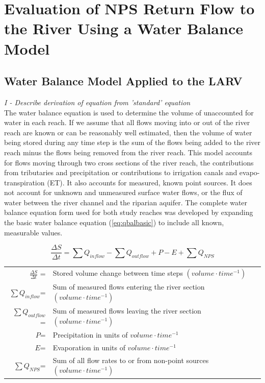 \chapter{Evaluation of NPS Return Flow to the River Using a Water Balance Model}
\label{chap:WaterBalanceModel}

\begin{linenumbers}
\section{Water Balance Model Applied to the LARV}
\label{sec:AppliedWaterModel}

\emph{I - Describe derivation of equation from 'standard' equation}\\
The water balance equation is used to determine the volume of unaccounted for water in each reach.  If we assume that all flows moving into or out of the river reach are known or can be reasonably well estimated, then the volume of water being stored during any time step is the sum of the flows being added to the river reach minus the flows being removed from the river reach.  This model accounts for flows moving through two cross sections of the river reach, the contributions from tributaries and precipitation or contributions to irrigation canals and evapo-transpiration (ET).  It also accounts for measured, known point sources.  It does not account for unknown and unmeasured surface water flows, or the flux of water between the river channel and the riparian aquifer.  The complete water balance equation form used for both study reaches was developed by expanding the basic water balance equation (\ref{eq:qbalbasic}) to include all known, measurable values.

\begin{equation}
	\frac{\Delta S}{\Delta t}=\sum{Q_{inflow}}-\sum{Q_{outflow}}+P-E+\sum{Q_{NPS}}
	\label{eq:qbalbasic}
\end{equation}
\begin{tabular}{rl}
$\frac{\Delta S}{\Delta t}$ =&Stored volume change between time steps $(volume \cdot time^{-1})$\\
$\sum{Q_{inflow}}$=&Sum of measured flows entering the river section $(volume \cdot time^{-1})$\\
$\sum{Q_{outflow}}$=&Sum of measured flows leaving the river section $(volume \cdot time^{-1})$\\
$P$=&Precipitation in units of $volume \cdot time^{-1}$\\
$E$=&Evaporation in units of $volume \cdot time^{-1}$\\
$\sum{Q_{NPS}}$=&Sum of all flow rates to or from non-point sources $(volume \cdot time^{-1})$\\
\end{tabular}\\


\end{linenumbers}
